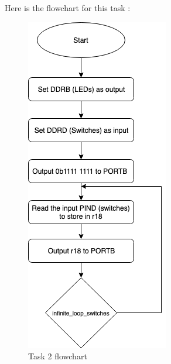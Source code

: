 \documentclass[a4paper,12pt]{article}
\begin{document}
Here is the flowchart for this task : 
\begin{figure}
\begin{center}
\includegraphics[width=\textwidth/3]{flowchart/task2_flowchart.png}
\end{center}
\caption{Task 2 flowchart}
\label{task2}
\end{figure}
\end{document}
